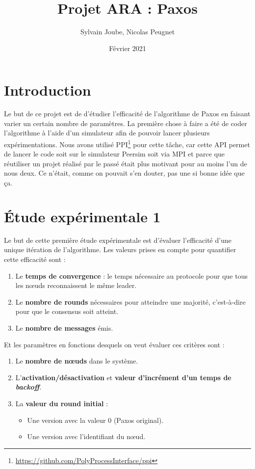 \documentclass[french]{article}
\title{Projet ARA : Paxos}
\date{Février 2021}
\author{Sylvain Joube, Nicolas Peugnet}
\begin{document}
\maketitle

\tableofcontents

\section*{Introduction}

Le but de ce projet est de d'étudier l'efficacité de l'algorithme de Paxos en faisant varier un certain nombre de paramètres.
La première chose à faire a été de coder l'algorithme à l'aide d'un simulateur afin de pouvoir lancer plusieurs expérimentations.
Nous avons utilisé PPI\footnote{\url{https://github.com/PolyProcessInterface/ppi}} pour cette tâche,
car cette API permet de lancer le code soit sur le simulateur Peersim soit via MPI et parce que réutiliser un projet réalisé par le passé était plus motivant pour au moins l'un de nous deux.
Ce n'était, comme on pouvait s'en douter, pas une si bonne idée que ça.

\section{Étude expérimentale 1}

Le but de cette première étude expérimentale est d'évaluer l'efficacité d'une unique itération de l'algorithme.
Les valeurs prises en compte pour quantifier cette efficacité sont :

\begin{enumerate}
	\item Le \textbf{temps de convergence} : le temps nécessaire au protocole pour que tous les nœuds reconnaissent le même leader.
	\item Le \textbf{nombre de rounds} nécessaires pour atteindre une majorité, c’est-à-dire pour que le consensus soit atteint.
	\item Le \textbf{nombre de messages} émis.
\end{enumerate}

Et les paramètres en fonctions desquels on veut évaluer ces critères sont :

\begin{enumerate}
	\item Le \textbf{nombre de nœuds} dans le système.
	\item L'\textbf{activation/désactivation} et \textbf{valeur d'incrément d’un temps de \emph{backoff}}.
	\item La \textbf{valeur du round initial} :
	\begin{itemize}
		\item Une version avec la valeur 0 (Paxos original).
		\item Une version avec l’identifiant du nœud.
	\end{itemize}
\end{enumerate}
\end{document}
